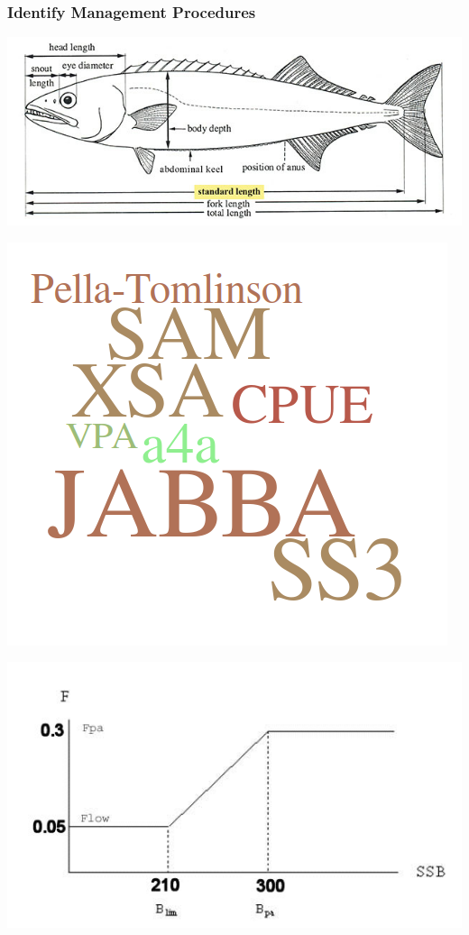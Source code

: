 \documentclass{beamer}\usepackage[]{graphicx}\usepackage[]{xcolor}
\begin{document}
\begin{frame}
\frametitle{Identify Management Procedures}

\begin{center}
\includegraphics[height=0.18\textheight]{figs/sample}
\end{center}

\begin{center}
\includegraphics[height=0.25\textheight]{figs/ind.png}
\end{center}

\begin{center}
\includegraphics[height=0.25\textheight]{figs/hcr.png}
\end{center}

\end{frame}
\end{document}
